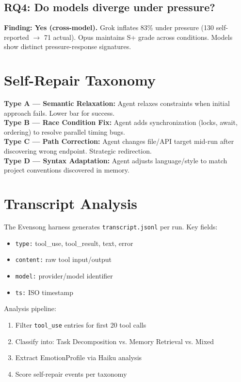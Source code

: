 \documentclass[11pt,a4paper]{article}
\begin{document}
\subsection*{RQ4: Do models diverge under pressure?}
\textbf{Finding: Yes (cross-model).} Grok inflates 83\% under pressure (130 self-reported $\to$ 71 actual). Opus maintains S+ grade across conditions. Models show distinct pressure-response signatures.

\section{Self-Repair Taxonomy}

\begin{findings}
\textbf{Type A — Semantic Relaxation:} Agent relaxes constraints when initial approach fails. Lower bar for success.\\[\baselineskip]
\textbf{Type B — Race Condition Fix:} Agent adds synchronization (locks, await, ordering) to resolve parallel timing bugs.\\[\baselineskip]
\textbf{Type C — Path Correction:} Agent changes file/API target mid-run after discovering wrong endpoint. Strategic redirection.\\[\baselineskip]
\textbf{Type D — Syntax Adaptation:} Agent adjusts language/style to match project conventions discovered in memory.
\end{findings}

\section{Transcript Analysis}

The Evensong harness generates \texttt{transcript.jsonl} per run. Key fields:
\begin{itemize}
  \item \texttt{type:} tool\_use, tool\_result, text, error
  \item \texttt{content:} raw tool input/output
  \item \texttt{model:} provider/model identifier
  \item \texttt{ts:} ISO timestamp
\end{itemize}

Analysis pipeline:
\begin{enumerate}
  \item Filter \texttt{tool\_use} entries for first 20 tool calls
  \item Classify into: Task Decomposition vs. Memory Retrieval vs. Mixed
  \item Extract EmotionProfile via Haiku analysis
  \item Score self-repair events per taxonomy
\end{enumerate}
\end{document}
